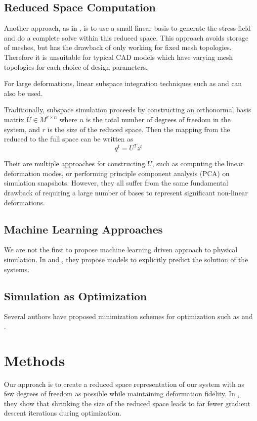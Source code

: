 \documentclass[sigconf, authorversion, review]{acmart}
\begin{document}
\subsection{Reduced Space Computation}

Another approach, as in \cite{Chen-16}, is to use a small linear basis to generate the stress field and do a complete solve within this reduced space. This approach avoids storage of meshes, but has the drawback of only working for fixed mesh topologies. Therefore it is unsuitable for typical CAD models which have varying mesh topologies for each choice of design parameters.

For large deformations, linear subspace integration techniques such as \cite{Barbic-05} and \cite{vonTycowicz-13} can also be used.

Traditionally, subspace simulation proceeds by constructing an orthonormal basis matrix $U\in M^{r\times n}$ where $n$ is the total number of degrees of freedom in the system, and $r$ is the size of the reduced space. Then the mapping from the reduced to the full space can be written as
$$q^t=U^Tz^t$$

Their are multiple approaches for constructing $U$, such as computing the linear deformation modes, or performing principle component analysis (PCA) on simulation snapshots. However, they all suffer from the same fundamental drawback of requiring a large number of bases to represent significant non-linear deformations.

\subsection{Machine Learning Approaches}
We are not the first to propose machine learning driven approach to physical simulation. In \cite{Ladicky-15} and \cite{CNNFluid2016}, they propose models to explicitly predict the solution of the systems.

\subsection{Simulation as Optimization}
Several authors have proposed minimization schemes for optimization such as \cite{Liu-17} and \cite{Wang-16}.


\section{Methods}
Our approach is to create a reduced space representation of our system with as few degrees of freedom as possible while maintaining deformation fidelity. In \cite{Musialski-16}, they show that shrinking the size of the reduced space leads to far fewer gradient descent iterations during optimization. 
\end{document}
